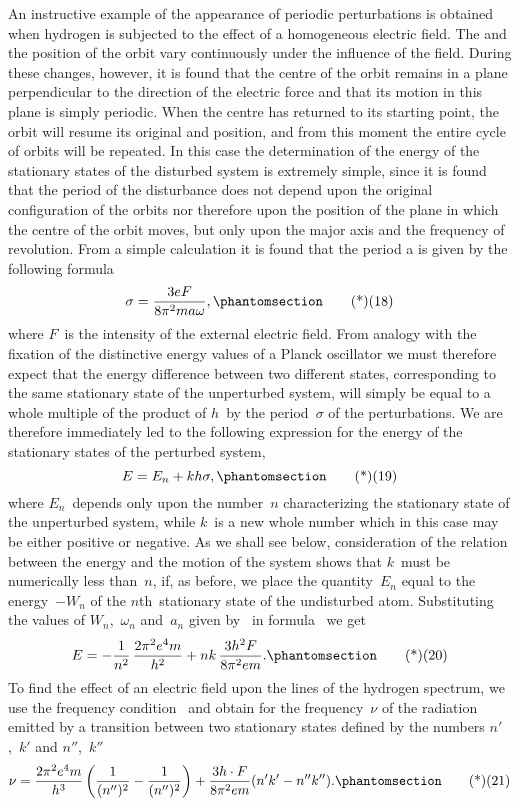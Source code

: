 An instructive example of the appearance of
periodic perturbations is obtained when hydrogen is subjected to
the effect of a homogeneous electric field. The  and
the position of the orbit vary continuously under the influence of
the field. During these changes, however, it is found that the
centre of the orbit remains in a plane perpendicular to the direction
of the electric force and that its motion in this plane is
simply periodic. When the centre has returned to its starting
point, the orbit will resume its original  and position,
and from this moment the entire cycle of orbits will be repeated.
In this case the determination of the energy of the stationary
states of the disturbed system is extremely simple, since it is found
that the period of the disturbance does not depend upon the
original configuration of the orbits nor therefore upon the position
of the plane in which the centre of the orbit moves, but only upon
the major axis and the frequency of revolution. From a simple
calculation it is found that the period a is given by the following
formula
\[
\sigma = \frac{3eF}{8\pi^{2} ma\omega},
\Tag{(18)}
\]
where $F$~is the intensity of the external electric field. From
analogy with the fixation of the distinctive energy values of a
Planck oscillator we must therefore expect that the energy difference
between two different states, corresponding to the same stationary
state of the unperturbed system, will simply be equal to a whole
multiple of the product of $h$~by the period~$\sigma$ of the perturbations.
We are therefore immediately led to the following expression for
the energy of the stationary states of the perturbed system,
\[
E = E_{n} + kh\sigma,
\Tag{(19)}
\]
where $E_{n}$~depends only upon the number~$n$ characterizing the
stationary state of the unperturbed system, while $k$~is a new whole
number which in this case may be either positive or negative. As
we shall see below, consideration of the relation between the energy
and the motion of the system shows that $k$~must be numerically
less than~$n$, if, as before, we place the quantity~$E_{n}$ equal to the
energy~$-W_{n}$ of the $n$th~stationary state of the undisturbed atom.
Substituting the values of $W_{n}$,~$\omega_{n}$ and~$a_{n}$ given by~ in formula~
we get
\[
E = -\frac{1}{n^{2}}\, \frac{2\pi^{2} e^{4} m}{h^{2}} + nk\, \frac{3h^{2} F}{8\pi^{2} em}.
\Tag{(20)}
\]
To find the effect of an electric field upon the lines of the hydrogen
spectrum, we use the frequency condition~ and obtain for the
frequency~$\nu$ of the radiation emitted by a transition between two
stationary states defined by the numbers $n'$,~$k'$ and $n''$,~$k''$
\[
\nu = \frac{2\pi^{2} e^{4} m}{h^{3}} \left(\frac{1}{(n'')^{2}} - \frac{1}{(n'')^{2}}\right)
  + \frac{3h \cdot F}{8\pi^{2} em} (n'k' - n''k'').
\Tag{(21)}
\]

